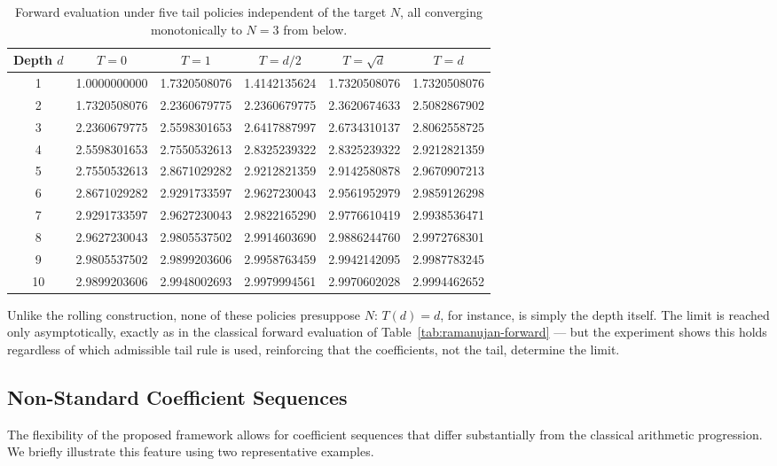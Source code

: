 \documentclass[11pt,a4paper]{amsart}
\theoremstyle{plain}
\theoremstyle{definition}
\theoremstyle{remark}
\begin{document}
\begin{table}[H]
\centering
\begin{tabular}{c|c|c|c|c|c}
Depth $d$ & $T=0$ & $T=1$ & $T=d/2$ & $T=\sqrt{d}$ & $T=d$ \\
\hline
1  & 1.0000000000 & 1.7320508076 & 1.4142135624 & 1.7320508076 & 1.7320508076 \\
2  & 1.7320508076 & 2.2360679775 & 2.2360679775 & 2.3620674633 & 2.5082867902 \\
3  & 2.2360679775 & 2.5598301653 & 2.6417887997 & 2.6734310137 & 2.8062558725 \\
4  & 2.5598301653 & 2.7550532613 & 2.8325239322 & 2.8325239322 & 2.9212821359 \\
5  & 2.7550532613 & 2.8671029282 & 2.9212821359 & 2.9142580878 & 2.9670907213 \\
6  & 2.8671029282 & 2.9291733597 & 2.9627230043 & 2.9561952979 & 2.9859126298 \\
7  & 2.9291733597 & 2.9627230043 & 2.9822165290 & 2.9776610419 & 2.9938536471 \\
8  & 2.9627230043 & 2.9805537502 & 2.9914603690 & 2.9886244760 & 2.9972768301 \\
9  & 2.9805537502 & 2.9899203606 & 2.9958763459 & 2.9942142095 & 2.9987783245 \\
10 & 2.9899203606 & 2.9948002693 & 2.9979994561 & 2.9970602028 & 2.9994462652
\end{tabular}
\caption{Forward evaluation under five tail policies independent of the target $N$, all converging monotonically to $N=3$ from below.}
\label{tab:tail-independence}
\end{table}

Unlike the rolling construction, none of these policies presuppose $N$: $T(d)=d$, for instance, is simply the depth itself. The limit is reached only asymptotically, exactly as in the classical forward evaluation of Table~\ref{tab:ramanujan-forward} — but the experiment shows this holds regardless of which admissible tail rule is used, reinforcing that the coefficients, not the tail, determine the limit.

\subsection{Non-Standard Coefficient Sequences}
\label{app:nonstandard}

The flexibility of the proposed framework allows for coefficient sequences that differ substantially from the classical arithmetic progression. We briefly illustrate this feature using two representative examples.
\end{document}
